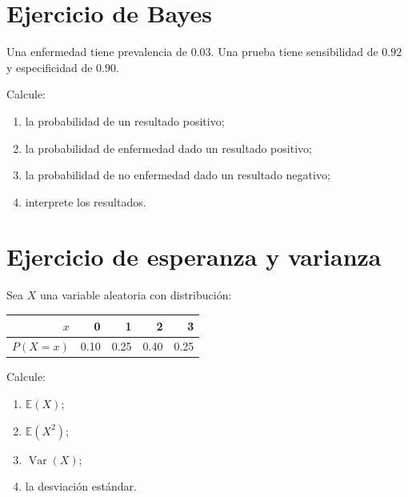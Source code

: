 \documentclass[
  spanish,
  10.5pt,
  letterpaper,
  DIV=11,
  numbers=noendperiod,
  oneside,
  open=any]{scrreprt}
\newcounter{none} %
\providecommand{\tightlist}{%
  \setlength{\itemsep}{0pt}\setlength{\parskip}{0pt}}
\theoremstyle{definition}
\theoremstyle{definition}
\theoremstyle{plain}
\theoremstyle{remark}
\begin{document}
\section*{Ejercicio de Bayes}\label{ejercicio-de-bayes}


Una enfermedad tiene prevalencia de \(0.03\). Una prueba tiene
sensibilidad de \(0.92\) y especificidad de \(0.90\).

Calcule:

\begin{enumerate}
\def\labelenumi{\arabic{enumi}.}
\tightlist
\item
  la probabilidad de un resultado positivo;
\item
  la probabilidad de enfermedad dado un resultado positivo;
\item
  la probabilidad de no enfermedad dado un resultado negativo;
\item
  interprete los resultados.
\end{enumerate}

\section*{Ejercicio de esperanza y
varianza}\label{ejercicio-de-esperanza-y-varianza}


Sea \(X\) una variable aleatoria con distribución:

{\def\LTcaptype{none} %
\begin{longtable}[]{@{}rrrrr@{}}
\toprule\noalign{}
\(x\) & 0 & 1 & 2 & 3 \\
\midrule\noalign{}
\endhead
\bottomrule\noalign{}
\endlastfoot
\(P(X=x)\) & 0.10 & 0.25 & 0.40 & 0.25 \\
\end{longtable}
}

Calcule:

\begin{enumerate}
\def\labelenumi{\arabic{enumi}.}
\tightlist
\item
  \(\mathbb{E}(X)\);
\item
  \(\mathbb{E}(X^2)\);
\item
  \(\operatorname{Var}(X)\);
\item
  la desviación estándar.
\end{enumerate}
\end{document}
